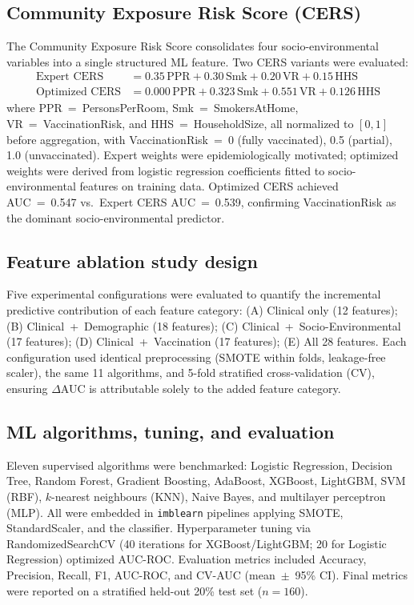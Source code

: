 \documentclass[3p,times,twocolumn]{elsarticle}
\begin{document}
\subsection{Community Exposure Risk Score (CERS)}
The Community Exposure Risk Score consolidates four socio-environmental variables into a single structured ML feature. Two CERS variants were evaluated:
\begin{align}
\text{Expert CERS} &= 0.35\,\text{PPR} + 0.30\,\text{Smk} + 0.20\,\text{VR} + 0.15\,\text{HHS} \\
\text{Optimized CERS} &= 0.000\,\text{PPR} + 0.323\,\text{Smk} + 0.551\,\text{VR} + 0.126\,\text{HHS}
\end{align}
where PPR~=~PersonsPerRoom, Smk~=~SmokersAtHome, VR~=~VaccinationRisk, and HHS~=~HouseholdSize, all normalized to $[0,1]$ before aggregation, with VaccinationRisk~=~0 (fully vaccinated), 0.5 (partial), 1.0 (unvaccinated). Expert weights were epidemiologically motivated; optimized weights were derived from logistic regression coefficients fitted to socio-environmental features on training data. Optimized CERS achieved AUC~=~0.547 vs.\ Expert CERS AUC~=~0.539, confirming VaccinationRisk as the dominant socio-environmental predictor.

\subsection{Feature ablation study design}
Five experimental configurations were evaluated to quantify the incremental predictive contribution of each feature category: (A) Clinical only (12 features); (B) Clinical~+~Demographic (18 features); (C) Clinical~+~Socio-Environmental (17 features); (D) Clinical~+~Vaccination (17 features); (E) All 28 features. Each configuration used identical preprocessing (SMOTE within folds, leakage-free scaler), the same 11 algorithms, and 5-fold stratified cross-validation (CV), ensuring $\Delta$AUC is attributable solely to the added feature category.

\subsection{ML algorithms, tuning, and evaluation}
Eleven supervised algorithms were benchmarked: Logistic Regression, Decision Tree, Random Forest, Gradient Boosting, AdaBoost, XGBoost, LightGBM, SVM (RBF), $k$-nearest neighbours (KNN), Naive Bayes, and multilayer perceptron (MLP). All were embedded in \texttt{imblearn} pipelines applying SMOTE, StandardScaler, and the classifier. Hyperparameter tuning via RandomizedSearchCV (40 iterations for XGBoost/LightGBM; 20 for Logistic Regression) optimized AUC-ROC. Evaluation metrics included Accuracy, Precision, Recall, F1, AUC-ROC, and CV-AUC (mean~$\pm$~95\% CI). Final metrics were reported on a stratified held-out 20\% test set ($n=160$).
\end{document}
